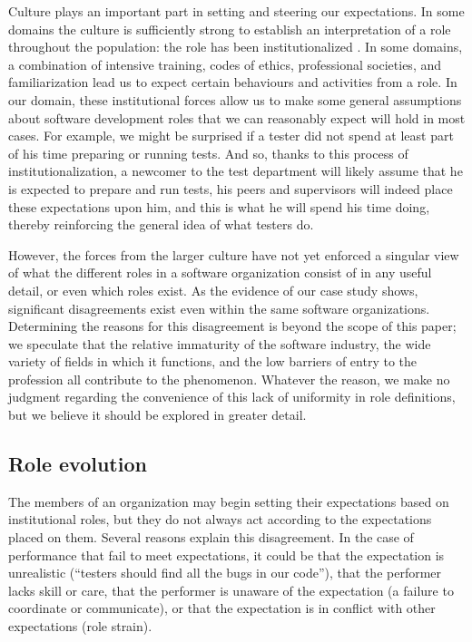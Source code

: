 \documentclass[10pt, conference, compsocconf]{IEEEtran}
\begin{document}
Culture plays an important part in setting and steering our expectations. In some domains the culture is sufficiently strong to establish an interpretation of a role throughout the population: the role has been institutionalized \cite{DiMaggio1991}. In some domains, a combination of intensive training, codes of ethics, professional societies, and familiarization lead us to expect certain behaviours and activities from a role. In our domain, these institutional forces allow us to make some general assumptions about software development roles that we can reasonably expect will hold in most cases. For example, we might be surprised if a tester did not spend at least part of his time preparing or running tests. And so, thanks to this process of institutionalization, a newcomer to the test department will likely assume that he is expected to prepare and run tests, his peers and supervisors will indeed place these expectations upon him, and this is what he will spend his time doing, thereby reinforcing the general idea of what testers do.

However, the forces from the larger culture have not yet enforced a singular view of what the different roles in a software organization consist of in any useful detail, or even which roles exist. As the evidence of our case study shows, significant disagreements exist even within the same software organizations. Determining the reasons for this disagreement is beyond the scope of this paper; we speculate that the relative immaturity of the software industry, the wide variety of fields in which it functions, and the low barriers of entry to the profession all contribute to the phenomenon. Whatever the reason, we make no judgment regarding the convenience of this lack of uniformity in role definitions, but we believe it should be explored in greater detail.


\subsection{Role evolution}

The members of an organization may begin setting their expectations based on institutional roles, but they do not always act according to the expectations placed on them. Several reasons explain this disagreement. In the case of performance that fail to meet expectations, it could be that the expectation is unrealistic (``testers should find all the bugs in our code''), that the performer lacks skill or care, that the performer is unaware of the expectation (a failure to coordinate or communicate), or that the expectation is in conflict with other expectations (role strain).
\end{document}
